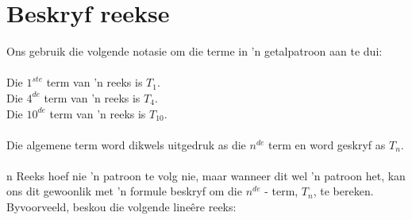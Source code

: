 \section{Beskryf reekse}


 
Ons gebruik die volgende notasie om die terme in 'n getalpatroon aan te dui:\\
\\
Die $1^{ste}$ term van 'n reeks is $T_{1}$.\\
Die $4^{de}$  term van 'n reeks is $T_{4}$.\\
Die $10^{de}$  term van 'n reeks is $T_{10}$.\\
\\
Die algemene term word dikwels uitgedruk as die ${n}^{de}$ term en word geskryf as ${T}_{n}$. \\

\\n Reeks hoef nie ’n patroon te volg nie, maar wanneer dit wel ’n patroon het, kan ons
dit gewoonlik met ’n formule beskryf om die ${n}^{de}$ - term, ${T}_{n}$, te bereken. 
Byvoorveeld, beskou die volgende lineêre reeks: 
     
